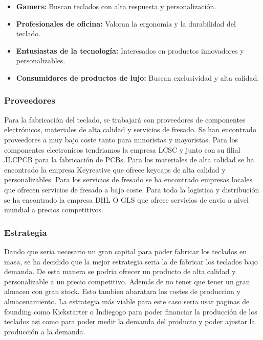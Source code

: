 \begin{itemize}
    \item \textbf{Gamers:} Buscan teclados con alta respuesta y personalización.
    \item \textbf{Profesionales de oficina:} Valoran la ergonomía y la durabilidad del teclado.
    \item \textbf{Entusiastas de la tecnología:} Interesados en productos innovadores y personalizables.
    \item \textbf{Consumidores de productos de lujo:} Buscan exclusividad y alta calidad.
\end{itemize}

\subsubsection{Proveedores}

Para la fabricación del teclado, se trabajará con proveedores de componentes electrónicos, materiales de alta calidad y servicios de fresado. Se han encontrado proveedores a muy bajo coste tanto para minoristas y mayoristas. Para los componentes electronicos tendriamos la empresa LCSC y junto con su filial JLCPCB para la fabricación de PCBs. 
Para los materiales de alta calidad se ha encontrado la empresa Keyreative que ofrece keycaps de alta calidad y personalizables. 
Para los servicios de fresado se ha encontrado empresas locales que ofrecen servicios de fresado a bajo coste. 
Para toda la logistica y distribución se ha encontrado la empresa DHL O GLS que ofrece servicios de envio a nivel mundial a precios competitivos.

\subsubsection{Estrategia}

Dando que seria necesario un gran capital para poder fabricar los teclados en masa, se ha decidido que la mejor estrategia seria la de fabricar los teclados bajo demanda. De esta manera se podria ofrecer un producto de alta calidad y personalizable a un precio competitivo. Además de no tener que tener un gran almacen con gran stock. Esto tambien abaratara los costes de produccion y almacenamiento. La estrategia más viable para este caso seria usar paginas de founding como Kickstarter o Indiegogo para poder financiar la producción de los teclados asi como para poder medir la demanda del producto y poder ajustar la producción a la demanda.

